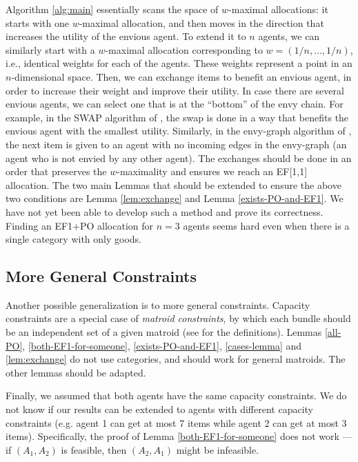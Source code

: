 \documentclass[sigconf]{aamas}
\theoremstyle{definition}
\begin{document}
Algorithm \ref{alg:main} essentially scans the space of $w$-maximal allocations: it starts with one $w$-maximal allocation, and then moves in the direction that increases the utility of the envious agent.
To extend it to $n$ agents, we can similarly start with a $w$-maximal allocation corresponding to $w = (1/n,\ldots,1/n)$, i.e., identical weights for each of the agents. 
These weights represent a point in an $n$-dimensional space.
Then, we can exchange items to benefit 
an envious agent, in order to increase their weight and improve their utility. In case there are several envious agents, we can select one that is at the “bottom” of the envy chain. For example, in the SWAP algorithm of \citet{biswas2018}, the swap is done in a way that benefits the envious agent with the smallest utility. Similarly, in the envy-graph algorithm of \citet{lipton2004}, the next item is given to an agent with no incoming edges in the envy-graph (an agent who is not envied by any other agent). 
The exchanges should be done in an order that preserves the $w$-maximality and ensures we reach an EF[1,1] allocation.
The two main Lemmas that should be extended to ensure the above two conditions are Lemma \ref{lem:exchange} and Lemma \ref{exists-PO-and-EF1}.
We have not yet been able to develop such a method and prove its correctness.
Finding an EF1+PO allocation for $n=3$ agents seems hard even when there is a single category with only goods.

\subsection{More General Constraints}
Another possible generalization is to more general constraints.
Capacity constraints are a special case of \emph{matroid constraints},
by which each bundle should be an independent set of a given matroid (see  \cite{biswas2018} for the definitions). 
Lemmas \ref{all-PO}, \ref{both-EF1-for-someone},
\ref{exists-PO-and-EF1},
\ref{cases-lemma}
and \ref{lem:exchange} 
do not use categories, and should work for general matroids. The other lemmas should be adapted.

Finally, we assumed that both agents have the same capacity constraints. We do not know if our results can be extended to agents with different capacity constraints (e.g. agent 1 can get at most 7 items while agent 2 can get at most 3 items). Specifically, the proof of Lemma \ref{both-EF1-for-someone} does not work --- if $(A_1,A_2)$ is feasible, then $(A_2,A_1)$ might be infeasible.
\end{document}
